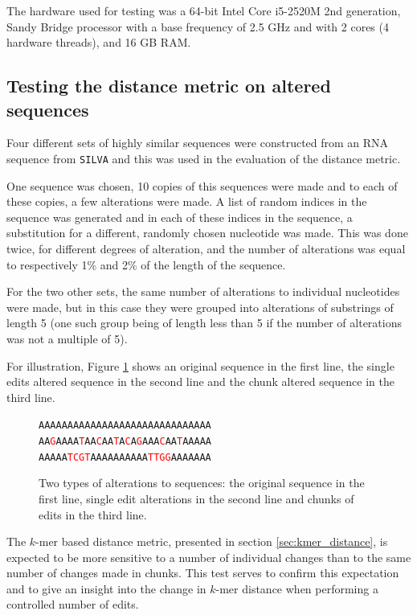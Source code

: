 The hardware used for testing was a 64-bit Intel Core i5-2520M 2nd generation,
Sandy Bridge processor with a base frequency of 2.5 GHz and with 2 cores (4
hardware threads), and 16 GB RAM.


\subsection{Testing the distance metric on altered sequences}
\label{sec:altered_sequences}

Four different sets of highly similar sequences were constructed from an RNA
sequence from \texttt{SILVA} and this was used in the evaluation of the
distance metric.

One sequence was chosen, 10 copies of this sequences were made and to each of
these copies, a few alterations were made. A list of random indices in the
sequence was generated and in each of these indices in the sequence, a
substitution for a different, randomly chosen nucleotide was made.  This was
done twice, for different degrees of alteration, and the number of alterations
was equal to respectively 1\% and 2\% of the length of the sequence.

For the two other sets, the same number of alterations to individual
nucleotides were made, but in this case they were grouped into alterations of
substrings of length 5 (one such group being of length less than 5 if the
number of alterations was not a multiple of 5).

For illustration, Figure \ref{fig:alterations} shows an original sequence in
the first line, the single edits altered sequence in the second line and the
chunk altered sequence in the third line.

\newcommand{\tc}[1]{\textcolor{red}{#1}}
\begin{figure}[H]
  \centering
  \texttt{AAAAAAAAAAAAAAAAAAAAAAAAAAAAAA} \\
  \texttt{AA\tc{G}AAAA\tc{T}AA\tc{C}AA\tc{T}A\tc{C}A\tc{G}AAA\tc{C}AA\tc{T}AAAAA} \\
  \texttt{AAAAA\tc{TCGT}AAAAAAAAAA\tc{TTGG}AAAAAAA}
  \caption{Two types of alterations to sequences: the original sequence in the
    first line, single edit alterations in the second line and chunks of edits
    in the third line.}
  \label{fig:alterations}
\end{figure}

The $k$-mer based distance metric, presented in section
\ref{sec:kmer_distance}, is expected to be more sensitive to a number of
individual changes than to the same number of changes made in chunks. This test
serves to confirm this expectation and to give an insight into the change in
$k$-mer distance when performing a controlled number of edits.

